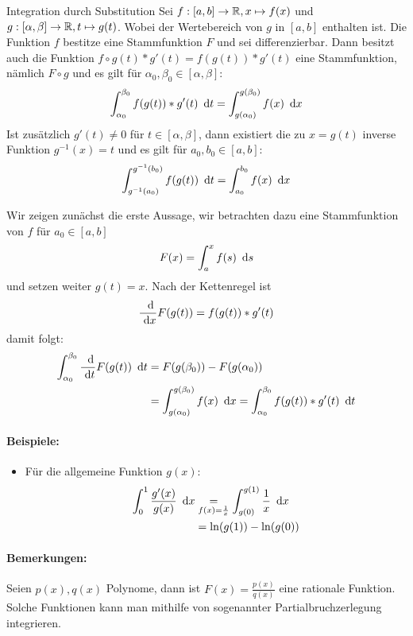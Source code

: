 \begin{satz}{Integration durch Substitution}
	Sei $f:[a,b]\rightarrow\mathbb{R}, x\mapsto f(x)$ und $g:[\alpha, \beta]\rightarrow\mathbb{R}, t\mapsto g(t)$.
	Wobei der Wertebereich von $g$ in $[a,b]$ enthalten ist. Die Funktion $f$ bestitze eine Stammfunktion $F$ und sei differenzierbar. Dann besitzt auch die Funktion $f\circ g(t)*g'(t)=f(g(t))*g'(t)$ eine Stammfunktion, nämlich $F\circ g$ und es gilt für $\alpha_0,\beta_0\in[\alpha, \beta]$:
	\begin{equation*}
		\int_{\alpha_0}^{\beta_0} f(g(t))*g'(t)\ \operatorname{d}\! t = \int_{g(\alpha_0)}^{g(\beta_0)} f(x)\ \operatorname{d}\! x
	\end{equation*}
	Ist zusätzlich $g'(t)\neq 0$ für $t\in[\alpha,\beta]$, dann existiert die zu $x=g(t)$ inverse Funktion $g^{-1}(x)=t$ und es gilt für $a_0, b_0\in[a,b]$:
	\begin{equation*}
		\int_{g^{-1}(a_0)}^{g^{-1}(b_0)} f(g(t))\ \operatorname{d}\! t=\int_{a_0}^{b_0} f(x)\ \operatorname{d}\! x
	\end{equation*}
\end{satz}
\begin{beweis}
	Wir zeigen zunächst die erste Aussage, wir betrachten dazu eine Stammfunktion von $f$ für $a_0\in[a,b]$
	\begin{equation*}
		F(x)=\int_a^x f(s)\ \operatorname{d}\! s
	\end{equation*}
	und setzen weiter $g(t)=x$. Nach der Kettenregel ist
	\begin{equation*}
		\frac{\ \operatorname{d}\!}{\ \operatorname{d}\! x}F(g(t))=f(g(t))*g'(t)
	\end{equation*}
	damit folgt:
	\begin{align*}
		\int_{\alpha_0}^{\beta_0}\frac{\ \operatorname{d}\!}{\ \operatorname{d}\! t} F(g(t))\ \operatorname{d}\! t
		&= F(g(\beta_0))-F(g(\alpha_0))\\
		&=\int_{g(\alpha_0)}^{g(\beta_0)} f(x) \ \operatorname{d}\! x= \int_{\alpha_0}^{\beta_0} f(g(t))*g'(t) \ \operatorname{d}\! t
	\end{align*}
\end{beweis}

\paragraph{Beispiele:}
\begin{itemize}
	\item Für die allgemeine Funktion $g(x)$:
	\begin{align*}
		\int_0^1 \frac{g'(x)}{g(x)}\ \operatorname{d}\! x &\underset{f(x)=\frac1x}
		=\int_{g(0)}^{g(1)} \frac1x \ \operatorname{d}\! x\\
		&=\ln(g(1))-\ln(g(0))
	\end{align*}
\end{itemize}

\paragraph{Bemerkungen:}
Seien $p(x),q(x)$ Polynome, dann ist $F(x)=\frac{p(x)}{q(x)}$ eine rationale Funktion. Solche Funktionen kann man mithilfe von sogenannter Partialbruchzerlegung integrieren.
